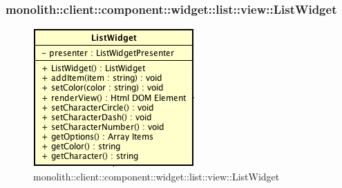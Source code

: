 \subsubsection{monolith::client::component::widget::list::view::ListWidget}

\label{monolith::client::component::widget::list::view::ListWidget}
\begin{figure}[H]
	\centering
	\includegraphics[scale=0.5]{Sezioni/SottosezioniST/img/ListWidget.png}
	\caption{monolith::client::component::widget::list::view::ListWidget}
\end{figure}

